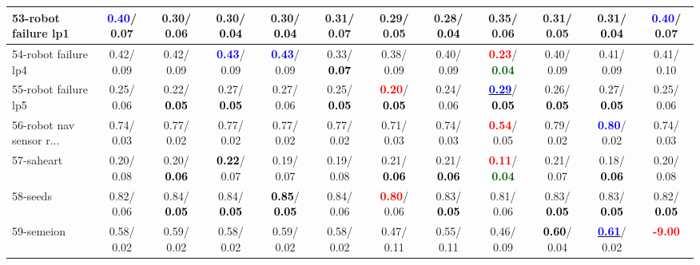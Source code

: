 \begin{table}[h]
\begin{center}
{\begin{tabular}{lc|c|c|c|c|c|c|c|c|c|c}
53-robot failure lp1 & \textcolor{blue}{\textbf{  0.40}}/  0.07 &   0.30/  0.06 &   0.30/\textcolor{black}{\textbf{  0.04}} &   0.30/\textcolor{black}{\textbf{  0.04}} &   0.31/  0.07 &   0.29/  0.05 &   0.28/\textcolor{black}{\textbf{  0.04}} &   0.35/  0.06 &   0.31/  0.05 &   0.31/\textcolor{black}{\textbf{  0.04}} & \textcolor{blue}{\textbf{  0.40}}/  0.07 \\ \hline
54-robot failure lp4 &   0.42/  0.09 &   0.42/  0.09 & \textcolor{blue}{\textbf{  0.43}}/  0.09 & \textcolor{blue}{\textbf{  0.43}}/  0.09 &   0.33/\textcolor{black}{\textbf{  0.07}} &   0.38/  0.09 &   0.40/  0.09 & \textcolor{red}{\textbf{  0.23}}/\textcolor{darkgreen}{\textbf{  0.04}} &   0.40/  0.09 &   0.41/  0.09 &   0.41/  0.10 \\
55-robot failure lp5 &   0.25/  0.06 &   0.22/\textcolor{black}{\textbf{  0.05}} &   0.27/\textcolor{black}{\textbf{  0.05}} &   0.27/  0.06 &   0.25/\textcolor{black}{\textbf{  0.05}} & \textcolor{red}{\textbf{  0.20}}/\textcolor{black}{\textbf{  0.05}} &   0.24/  0.06 & \underline{\textcolor{blue}{\textbf{  0.29}}}/\textcolor{black}{\textbf{  0.05}} &   0.26/\textcolor{black}{\textbf{  0.05}} &   0.27/\textcolor{black}{\textbf{  0.05}} &   0.25/  0.06 \\
56-robot nav sensor r... &   0.74/  0.03 &   0.77/  0.02 &   0.77/  0.02 &   0.77/  0.02 &   0.77/  0.02 &   0.71/  0.03 &   0.74/  0.03 & \textcolor{red}{\textbf{  0.54}}/  0.05 &   0.79/  0.02 & \textcolor{blue}{\textbf{  0.80}}/  0.02 &   0.74/  0.03 \\
57-saheart &   0.20/  0.08 &   0.20/\textcolor{black}{\textbf{  0.06}} & \textcolor{black}{\textbf{  0.22}}/  0.07 &   0.19/  0.07 &   0.19/  0.08 &   0.21/\textcolor{black}{\textbf{  0.06}} &   0.21/\textcolor{black}{\textbf{  0.06}} & \textcolor{red}{\textbf{  0.11}}/\textcolor{darkgreen}{\textbf{  0.04}} &   0.21/  0.07 &   0.18/\textcolor{black}{\textbf{  0.06}} &   0.20/  0.08 \\
58-seeds &   0.82/  0.06 &   0.84/\textcolor{black}{\textbf{  0.05}} &   0.84/\textcolor{black}{\textbf{  0.05}} & \textcolor{black}{\textbf{  0.85}}/\textcolor{black}{\textbf{  0.05}} &   0.84/  0.06 & \textcolor{red}{\textbf{  0.80}}/  0.06 &   0.83/\textcolor{black}{\textbf{  0.05}} &   0.81/  0.06 &   0.83/\textcolor{black}{\textbf{  0.05}} &   0.83/\textcolor{black}{\textbf{  0.05}} &   0.82/\textcolor{black}{\textbf{  0.05}} \\
59-semeion &   0.58/  0.02 &   0.59/  0.02 &   0.58/  0.02 &   0.59/  0.02 &   0.58/  0.02 &   0.47/  0.11 &   0.55/  0.11 &   0.46/  0.09 & \textcolor{black}{\textbf{  0.60}}/  0.04 & \underline{\textcolor{blue}{\textbf{  0.61}}}/  0.02 & \textcolor{red}{\textbf{ -9.00}} \\

\end{tabular}}
\end{center}
\end{table}
